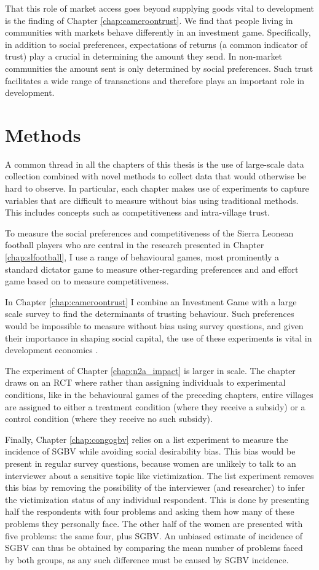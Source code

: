 That this role of market access goes beyond supplying goods vital to development is the finding of Chapter \ref{chap:cameroontrust}. We find that people living in communities with markets behave differently in an investment game. Specifically, in addition to social preferences, expectations of returns (a common indicator of trust) play a crucial in determining the amount they send. In non-market communities the amount sent is only determined by social preferences. 	Such trust facilitates a wide range of transactions and therefore plays an important role in development.

\section{Methods}
A common thread in all the chapters of this thesis is the use of large-scale data collection combined with novel methods to collect data that would otherwise be hard to observe. In particular, each chapter makes  use of experiments to capture variables that are difficult to measure without bias using traditional methods. This includes concepts such as competitiveness and intra-village trust.

To measure the social preferences and competitiveness of the Sierra Leonean football players who are central in the research presented in Chapter \ref{chap:slfootball}, I use a range of behavioural games, most prominently a standard dictator game to measure other-regarding preferences and and effort game based on \citet{Niederle2007} to measure competitiveness.  

In Chapter \ref{chap:cameroontrust} I combine an Investment Game \citep{Berg1995} with a large scale survey to find the determinants of trusting behaviour. Such preferences would be impossible to measure without bias using survey questions, and given their importance in shaping social capital, the use of these experiments is vital in development economics \citep[see e.g]{Camerer1995, Cardenas2008a}.

The experiment of Chapter \ref{chap:n2a_impact} is larger in scale. The chapter draws on an RCT where rather than assigning individuals to experimental conditions, like in the behavioural games of the preceding chapters, entire villages are assigned to either a treatment condition (where they receive a subsidy) or a control condition (where they receive no such subsidy).

Finally, Chapter \ref{chap:congogbv} relies on a list experiment to measure the incidence of SGBV while avoiding social desirability bias. This bias would be present in regular survey questions, because women are unlikely to talk to an interviewer about a sensitive topic like victimization. The list experiment removes this bias by removing the possibility of the interviewer (and researcher) to infer the victimization status of any individual respondent. This is done by presenting half the respondents with four problems and asking them how many of these problems they personally face. The other half of the women are presented with five problems: the same four, plus SGBV. An unbiased estimate of incidence of SGBV can thus be obtained by comparing the mean number of problems faced by both groups, as any such difference must be caused by SGBV incidence. 


